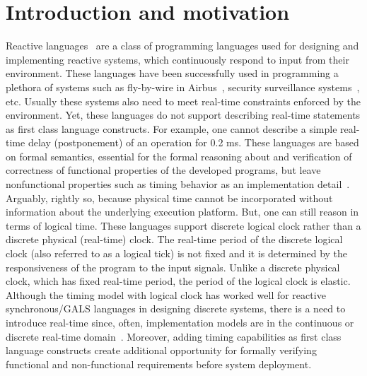 \section{Introduction and motivation}
\label{sec:intr-motiv}

Reactive languages~\cite{gber931,amal10} are a class of programming
languages used for designing and implementing reactive systems, which
continuously respond to input from their environment. These languages
have been successfully used in programming a plethora of systems such as
fly-by-wire in Airbus~\cite{eairbus}, security surveillance
systems~\cite{amal121}, etc.  Usually these systems also need to meet
real-time constraints enforced by the environment. Yet, these languages
do not support describing real-time statements as first class language
constructs.  For example, one cannot describe a simple real-time delay
(postponement) of an operation for 0.2 ms. These languages are based on
formal semantics, essential for the formal reasoning about and
verification of correctness of functional properties of the developed
programs, but leave nonfunctional properties such as timing behavior as
an implementation detail~\cite{boldt07}. Arguably, rightly so, because
physical time cannot be incorporated without information about the
underlying execution platform.  But, one can still reason in terms of
logical time. These languages support discrete logical clock rather than
a discrete physical (real-time) clock. The real-time period of the
discrete logical clock (also referred to as a logical tick) is not fixed
and it is determined by the responsiveness of the program to the input
signals. Unlike a discrete physical clock, which has fixed real-time
period, the period of the logical clock is elastic. Although the timing
model with logical clock has worked well for reactive synchronous/GALS
languages in designing discrete systems, there is a need to introduce
real-time since, often, implementation models are in the continuous or
discrete real-time domain~\cite{DBLP:journals/pieee/SifakisTY03}.
Moreover, adding timing capabilities as first class language constructs
create additional opportunity for formally verifying functional and
non-functional requirements before system deployment.



